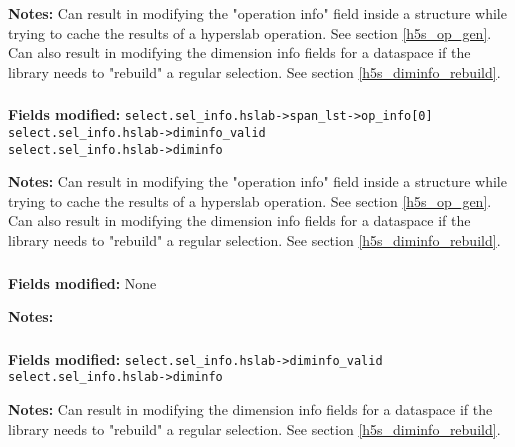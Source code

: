 \documentclass[../HDF5_RFC.tex]{subfiles}
\begin{document}
\textbf{Notes:} Can result in modifying the "operation info" field inside a structure while trying to
cache the results of a hyperslab operation. See section \ref{h5s_op_gen}. Can also result in modifying
the dimension info fields for a dataspace if the library needs to "rebuild" a regular selection. See
section \ref{h5s_diminfo_rebuild}.

\subsubsection{}

\textbf{Fields modified:} \texttt{select.sel\_info.hslab->span\_lst->op\_info[0]} \\
\texttt{select.sel\_info.hslab->diminfo\_valid} \\
\texttt{select.sel\_info.hslab->diminfo}

\textbf{Notes:} Can result in modifying the "operation info" field inside a structure while trying to
cache the results of a hyperslab operation. See section \ref{h5s_op_gen}. Can also result in modifying
the dimension info fields for a dataspace if the library needs to "rebuild" a regular selection. See
section \ref{h5s_diminfo_rebuild}.

\subsubsection{}

\textbf{Fields modified:} None

\textbf{Notes:}

\subsubsection{}

\textbf{Fields modified:} \texttt{select.sel\_info.hslab->diminfo\_valid} \\
\texttt{select.sel\_info.hslab->diminfo}

\textbf{Notes:} Can result in modifying the dimension info fields for a dataspace if the library needs
to "rebuild" a regular selection. See section \ref{h5s_diminfo_rebuild}.

\subsubsection{}
\end{document}
